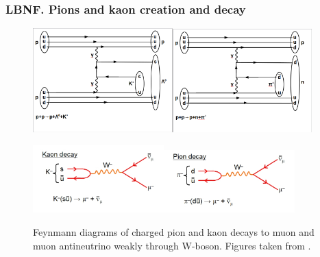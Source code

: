 \begin{frame}\frametitle{LBNF. Pions and kaon creation and decay}
\scriptsize
\begin{figure}
\label{fig:pionAndKaonProductions}
\centering
\includegraphics[width=0.48\textwidth, keepaspectratio=true]{figs/ppKaonProduction.png}\includegraphics[width=0.48\textwidth, keepaspectratio=true]{figs/ppPionProduction.png}  
\end{figure}
\begin{figure}
\caption{Feynmann diagrams of charged pion and kaon decays to muon and muon antineutrino weakly through W-boson. Figures taken from \cite{ref_fig_pionandKaonDecays}.}
\label{fig:pionAndKaonDecays}
\centering
\includegraphics[width=0.45\textwidth, keepaspectratio=true]{figs/kaonDecay.jpg}\includegraphics[width=0.45\textwidth, keepaspectratio=true]{figs/pionDecay.jpg} 
\end{figure}
\end{frame}


